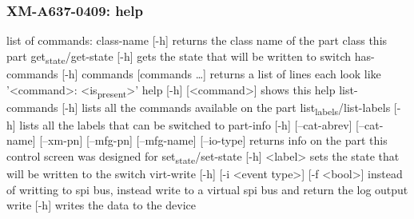 \documentclass[11pt]{article}
\begin{document}
\subsubsection{XM-A637-0409: help}
\label{sec:orgda1e4d3}
list of commands:
  class-name [-h]
    returns the class name of the part class this part
  get\textsubscript{state}/get-state [-h]
    gets the state that will be written to switch
  has-commands [-h] commands [commands \ldots{}]
    returns a list of lines each look like '<command>: <is\textsubscript{present}>'
  help [-h] [<command>]
    shows this help
  list-commands [-h]
    lists all the commands available on the part
  list\textsubscript{labels}/list-labels [-h]
    lists all the labels that can be switched to
  part-info  [-h] [--cat-abrev] [--cat-name] [--xm-pn] [--mfg-pn] [--mfg-name]
          [--io-type]
    returns info on the part this control screen was designed for
  set\textsubscript{state}/set-state [-h] <label>
    sets the state that will be written to the switch
  virt-write [-h] [-i <event type>] [-f <bool>]
    instead of writting to spi bus, instead write to a virtual spi bus
    and return the log output
  write [-h]
    writes the data to the device
\end{document}
